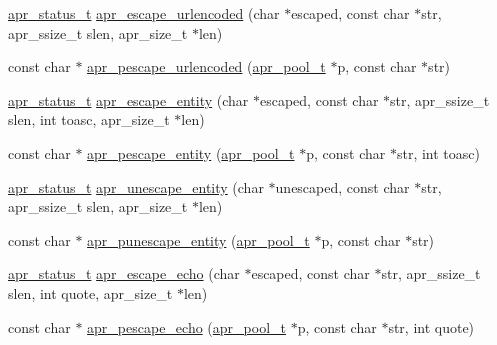 \begin{DoxyCompactItemize}
\item 
\hyperlink{group__apr__errno_gaf76ee4543247e9fb3f3546203e590a6c}{apr\+\_\+status\+\_\+t} \hyperlink{group___a_p_r___util___escaping_ga0a2cb4e99758afd5bed8fd62df05e16f}{apr\+\_\+escape\+\_\+urlencoded} (char $\ast$escaped, const char $\ast$str, apr\+\_\+ssize\+\_\+t slen, apr\+\_\+size\+\_\+t $\ast$len)
\item 
const char $\ast$ \hyperlink{group___a_p_r___util___escaping_ga9caffb30731e3a07a8e23fa6464d35b5}{apr\+\_\+pescape\+\_\+urlencoded} (\hyperlink{group__apr__pools_gaf137f28edcf9a086cd6bc36c20d7cdfb}{apr\+\_\+pool\+\_\+t} $\ast$p, const char $\ast$str)
\item 
\hyperlink{group__apr__errno_gaf76ee4543247e9fb3f3546203e590a6c}{apr\+\_\+status\+\_\+t} \hyperlink{group___a_p_r___util___escaping_ga6973ca9a596c8fc9fc34eab647cff11c}{apr\+\_\+escape\+\_\+entity} (char $\ast$escaped, const char $\ast$str, apr\+\_\+ssize\+\_\+t slen, int toasc, apr\+\_\+size\+\_\+t $\ast$len)
\item 
const char $\ast$ \hyperlink{group___a_p_r___util___escaping_gad99b0f505645b63b5f552f5d35f174af}{apr\+\_\+pescape\+\_\+entity} (\hyperlink{group__apr__pools_gaf137f28edcf9a086cd6bc36c20d7cdfb}{apr\+\_\+pool\+\_\+t} $\ast$p, const char $\ast$str, int toasc)
\item 
\hyperlink{group__apr__errno_gaf76ee4543247e9fb3f3546203e590a6c}{apr\+\_\+status\+\_\+t} \hyperlink{group___a_p_r___util___escaping_ga9b835b2da5bf35c33f6c69e8e3100c99}{apr\+\_\+unescape\+\_\+entity} (char $\ast$unescaped, const char $\ast$str, apr\+\_\+ssize\+\_\+t slen, apr\+\_\+size\+\_\+t $\ast$len)
\item 
const char $\ast$ \hyperlink{group___a_p_r___util___escaping_gabaaeff6e19e92cf1f138b21e87889e05}{apr\+\_\+punescape\+\_\+entity} (\hyperlink{group__apr__pools_gaf137f28edcf9a086cd6bc36c20d7cdfb}{apr\+\_\+pool\+\_\+t} $\ast$p, const char $\ast$str)
\item 
\hyperlink{group__apr__errno_gaf76ee4543247e9fb3f3546203e590a6c}{apr\+\_\+status\+\_\+t} \hyperlink{group___a_p_r___util___escaping_ga4ebbadaffa33c6aa34e92108c45cd38e}{apr\+\_\+escape\+\_\+echo} (char $\ast$escaped, const char $\ast$str, apr\+\_\+ssize\+\_\+t slen, int quote, apr\+\_\+size\+\_\+t $\ast$len)
\item 
const char $\ast$ \hyperlink{group___a_p_r___util___escaping_ga1265c454e145b9fca52d2feafacd4a02}{apr\+\_\+pescape\+\_\+echo} (\hyperlink{group__apr__pools_gaf137f28edcf9a086cd6bc36c20d7cdfb}{apr\+\_\+pool\+\_\+t} $\ast$p, const char $\ast$str, int quote)

\end{DoxyCompactItemize}

